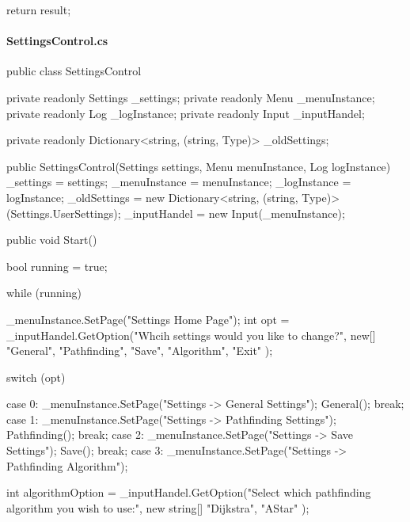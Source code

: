 \begin{flushleft}
\begin{cscode}
{{        return result;
    }

}
    \end{cscode}
\pagebreak
    
    \paragraph{SettingsControl.cs}
    \begin{cscode}
public class SettingsControl
{
    private readonly Settings _settings;
    private readonly Menu _menuInstance;
    private readonly Log _logInstance;
    private readonly Input _inputHandel;

    private readonly Dictionary<string, (string, Type)> _oldSettings;

    public SettingsControl(Settings settings, Menu menuInstance, Log logInstance)
    {
        _settings = settings;
        _menuInstance = menuInstance;
        _logInstance = logInstance;
        _oldSettings = new Dictionary<string, (string, Type)>(Settings.UserSettings);
        _inputHandel = new Input(_menuInstance);
    }

    public void Start()
    {
        bool running = true;

        while (running)
        {
            _menuInstance.SetPage("Settings Home Page");
            int opt = _inputHandel.GetOption("Whcih settings would you like to change?",
                new[]
                {
                    "General",
                    "Pathfinding",
                    "Save",
                    "Algorithm",
                    "Exit"
                }
            );

            switch (opt)
            {
                case 0:
                    _menuInstance.SetPage("Settings -> General Settings");
                    General();
                    break;
                case 1:
                    _menuInstance.SetPage("Settings -> Pathfinding Settings");
                    Pathfinding();
                    break;
                case 2:
                    _menuInstance.SetPage("Settings -> Save Settings");
                    Save();
                    break;
                case 3:
                    _menuInstance.SetPage("Settings -> Pathfinding Algorithm");

                    int algorithmOption = _inputHandel.GetOption("Select which pathfinding algorithm you wish to use:", new string[] {
                        "Dijkstra",
                        "AStar"
                    });

}}}}
\end{cscode}
\end{flushleft}

